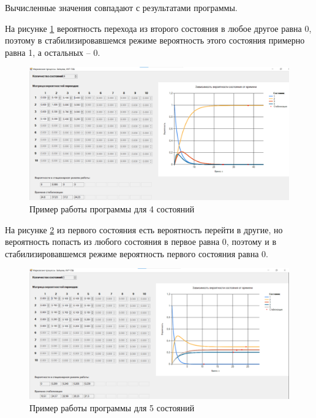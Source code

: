 \documentclass[14pt, a4paper]{extarticle}
\begin{document}
Вычисленные значения совпадают с результатами программы.



\newpage
На рисунке \ref{pic:2} вероятность перехода из второго состояния в любое другое равна 0, поэтому в стабилизировавшемся режиме вероятность этого состояния примерно равна 1, а остальных -- 0.
\begin{figure}[h]
	\begin{center}
		{\includegraphics[scale=0.45]{pictures/2.png}
			\caption{Пример работы программы для 4 состояний}
			\label{pic:2}}
	\end{center}
\end{figure}


\newpage
На рисунке \ref{pic:3} из первого состояния есть вероятность перейти в другие, но вероятность попасть из любого состояния в первое равна 0, поэтому и в стабилизировавшемся режиме вероятность первого состояния равна 0.
\begin{figure}[h]
	\begin{center}
		{\includegraphics[scale=0.45]{pictures/3.png}
			\caption{Пример работы программы для 5 состояний}
			\label{pic:3}}
	\end{center}
\end{figure}
\end{document}
